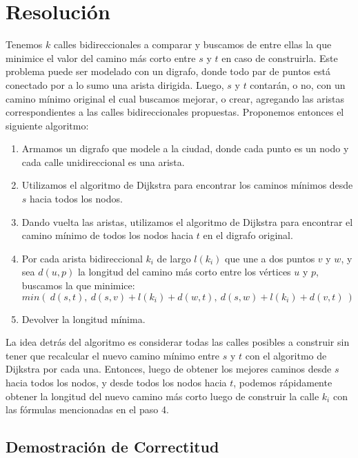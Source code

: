\section{Resolución}

Tenemos $k$ calles bidireccionales a comparar y buscamos de entre ellas la que minimice el valor del camino más corto entre $s$ y $t$ en caso de construirla. Este problema puede ser modelado con un digrafo, donde todo par de puntos está conectado por a lo sumo una arista dirigida. Luego, $s$ y $t$ contarán, o no, con un camino mínimo original el cual buscamos mejorar, o crear, agregando las aristas correspondientes a las calles bidireccionales propuestas. Proponemos entonces el siguiente algoritmo:

\begin{enumerate}
    \item Armamos un digrafo que modele a la ciudad, donde cada punto es un nodo y cada calle unidireccional es una arista. 
    \item Utilizamos el algoritmo de Dijkstra para encontrar los caminos mínimos desde $s$ hacia todos los nodos.
    \item Dando vuelta las aristas, utilizamos el algoritmo de Dijkstra para encontrar el camino mínimo de todos los nodos hacia $t$ en el digrafo original.
    \item Por cada arista bidireccional $k_i$ de largo $l(k_i)$ que une a dos puntos $v$ y $w$, y sea $d(u,p)$ la longitud del camino más corto entre los vértices $u$ y $p$, buscamos la que minimice:
     $$min(\ d(s,t),\ d(s,v) + l(k_i) + d(w,t),\ d(s,w) + l(k_i) + d(v,t)\ )$$
    \item Devolver la longitud mínima.
\end{enumerate}


La idea detrás del algoritmo es considerar todas las calles posibles a construir sin tener que recalcular el nuevo camino mínimo entre $s$ y $t$ con el algoritmo de Dijkstra por cada una. Entonces, luego de obtener los mejores caminos desde $s$ hacia todos los nodos, y desde todos los nodos hacia $t$, podemos rápidamente obtener la longitud del nuevo camino más corto luego de construir la calle $k_i$ con las fórmulas mencionadas en el paso 4. 


\subsection{Demostración de Correctitud}
\vspace{1em}

